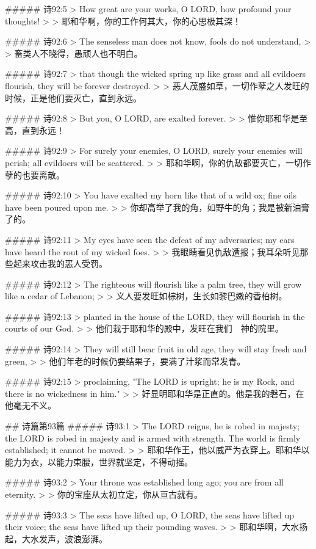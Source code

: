 ##### 诗92:5
> How great are your works, O LORD, how profound your thoughts!
>
> 耶和华啊，你的工作何其大，你的心思极其深！


##### 诗92:6
> The senseless man does not know, fools do not understand,
>
> 畜类人不晓得，愚顽人也不明白。


##### 诗92:7
> that though the wicked spring up like grass and all evildoers flourish, they will be forever destroyed.
>
> 恶人茂盛如草，一切作孽之人发旺的时候，正是他们要灭亡，直到永远。


##### 诗92:8
> But you, O LORD, are exalted forever.
>
> 惟你耶和华是至高，直到永远！


##### 诗92:9
> For surely your enemies, O LORD, surely your enemies will perish; all evildoers will be scattered.
>
> 耶和华啊，你的仇敌都要灭亡，一切作孽的也要离散。


##### 诗92:10
> You have exalted my horn like that of a wild ox; fine oils have been poured upon me.
>
> 你却高举了我的角，如野牛的角；我是被新油膏了的。


##### 诗92:11
> My eyes have seen the defeat of my adversaries; my ears have heard the rout of my wicked foes.
>
> 我眼睛看见仇敌遭报；我耳朵听见那些起来攻击我的恶人受罚。


##### 诗92:12
> The righteous will flourish like a palm tree, they will grow like a cedar of Lebanon;
>
> 义人要发旺如棕树，生长如黎巴嫩的香柏树。


##### 诗92:13
> planted in the house of the LORD, they will flourish in the courts of our God.
>
> 他们栽于耶和华的殿中，发旺在我们　神的院里。


##### 诗92:14
> They will still bear fruit in old age, they will stay fresh and green,
>
> 他们年老的时候仍要结果子，要满了汁浆而常发青。


##### 诗92:15
> proclaiming, "The LORD is upright; he is my Rock, and there is no wickedness in him."
>
> 好显明耶和华是正直的。他是我的磐石，在他毫无不义。


## 诗篇第93篇
##### 诗93:1
> The LORD reigns, he is robed in majesty; the LORD is robed in majesty and is armed with strength. The world is firmly established; it cannot be moved.
>
> 耶和华作王，他以威严为衣穿上。耶和华以能力为衣，以能力束腰，世界就坚定，不得动摇。


##### 诗93:2
> Your throne was established long ago; you are from all eternity.
>
> 你的宝座从太初立定，你从亘古就有。


##### 诗93:3
> The seas have lifted up, O LORD, the seas have lifted up their voice; the seas have lifted up their pounding waves.
>
> 耶和华啊，大水扬起，大水发声，波浪澎湃。


